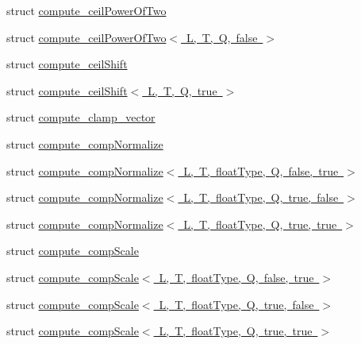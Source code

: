 \begin{DoxyCompactItemize}
\item 
struct \mbox{\hyperlink{structglm_1_1detail_1_1compute__ceil_power_of_two}{compute\+\_\+ceil\+Power\+Of\+Two}}
\item 
struct \mbox{\hyperlink{structglm_1_1detail_1_1compute__ceil_power_of_two_3_01_l_00_01_t_00_01_q_00_01false_01_4}{compute\+\_\+ceil\+Power\+Of\+Two$<$ L, T, Q, false $>$}}
\item 
struct \mbox{\hyperlink{structglm_1_1detail_1_1compute__ceil_shift}{compute\+\_\+ceil\+Shift}}
\item 
struct \mbox{\hyperlink{structglm_1_1detail_1_1compute__ceil_shift_3_01_l_00_01_t_00_01_q_00_01true_01_4}{compute\+\_\+ceil\+Shift$<$ L, T, Q, true $>$}}
\item 
struct \mbox{\hyperlink{structglm_1_1detail_1_1compute__clamp__vector}{compute\+\_\+clamp\+\_\+vector}}
\item 
struct \mbox{\hyperlink{structglm_1_1detail_1_1compute__comp_normalize}{compute\+\_\+comp\+Normalize}}
\item 
struct \mbox{\hyperlink{structglm_1_1detail_1_1compute__comp_normalize_3_01_l_00_01_t_00_01float_type_00_01_q_00_01false_00_01true_01_4}{compute\+\_\+comp\+Normalize$<$ L, T, float\+Type, Q, false, true $>$}}
\item 
struct \mbox{\hyperlink{structglm_1_1detail_1_1compute__comp_normalize_3_01_l_00_01_t_00_01float_type_00_01_q_00_01true_00_01false_01_4}{compute\+\_\+comp\+Normalize$<$ L, T, float\+Type, Q, true, false $>$}}
\item 
struct \mbox{\hyperlink{structglm_1_1detail_1_1compute__comp_normalize_3_01_l_00_01_t_00_01float_type_00_01_q_00_01true_00_01true_01_4}{compute\+\_\+comp\+Normalize$<$ L, T, float\+Type, Q, true, true $>$}}
\item 
struct \mbox{\hyperlink{structglm_1_1detail_1_1compute__comp_scale}{compute\+\_\+comp\+Scale}}
\item 
struct \mbox{\hyperlink{structglm_1_1detail_1_1compute__comp_scale_3_01_l_00_01_t_00_01float_type_00_01_q_00_01false_00_01true_01_4}{compute\+\_\+comp\+Scale$<$ L, T, float\+Type, Q, false, true $>$}}
\item 
struct \mbox{\hyperlink{structglm_1_1detail_1_1compute__comp_scale_3_01_l_00_01_t_00_01float_type_00_01_q_00_01true_00_01false_01_4}{compute\+\_\+comp\+Scale$<$ L, T, float\+Type, Q, true, false $>$}}
\item 
struct \mbox{\hyperlink{structglm_1_1detail_1_1compute__comp_scale_3_01_l_00_01_t_00_01float_type_00_01_q_00_01true_00_01true_01_4}{compute\+\_\+comp\+Scale$<$ L, T, float\+Type, Q, true, true $>$}}

\end{DoxyCompactItemize}
